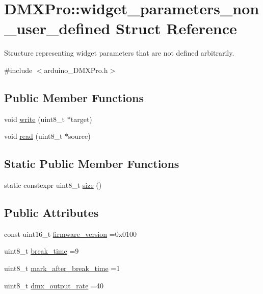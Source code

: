 \hypertarget{structDMXPro_1_1widget__parameters__non__user__defined}{}\section{D\+M\+X\+Pro\+:\+:widget\+\_\+parameters\+\_\+non\+\_\+user\+\_\+defined Struct Reference}
\label{structDMXPro_1_1widget__parameters__non__user__defined}


Structure representing widget parameters that are not defined arbitrarily.  




{\ttfamily \#include $<$arduino\+\_\+\+D\+M\+X\+Pro.\+h$>$}

\subsection*{Public Member Functions}
\begin{DoxyCompactItemize}
\item 
void \hyperlink{structDMXPro_1_1widget__parameters__non__user__defined_a25c093468533097e9b06f395b98381e4}{write} (uint8\+\_\+t $\ast$target)
\item 
void \hyperlink{structDMXPro_1_1widget__parameters__non__user__defined_a90e515d288e7fc8582622bc3719774ec}{read} (uint8\+\_\+t $\ast$source)
\end{DoxyCompactItemize}
\subsection*{Static Public Member Functions}
\begin{DoxyCompactItemize}
\item 
static constexpr uint8\+\_\+t \hyperlink{structDMXPro_1_1widget__parameters__non__user__defined_a0fe1584a072b9fa8b3f18c3e5b61cedc}{size} ()
\end{DoxyCompactItemize}
\subsection*{Public Attributes}
\begin{DoxyCompactItemize}
\item 
const uint16\+\_\+t \hyperlink{structDMXPro_1_1widget__parameters__non__user__defined_a499e78f749932ed279e0d23a2716f2ae}{firmware\+\_\+version} =0x0100
\item 
uint8\+\_\+t \hyperlink{structDMXPro_1_1widget__parameters__non__user__defined_ae371cdc7a6b668f9360b1e4eee833f5e}{break\+\_\+time} =9
\item 
uint8\+\_\+t \hyperlink{structDMXPro_1_1widget__parameters__non__user__defined_a0622e5c23a87de586955dd8758ec6a2d}{mark\+\_\+after\+\_\+break\+\_\+time} =1
\item 
uint8\+\_\+t \hyperlink{structDMXPro_1_1widget__parameters__non__user__defined_a6e4165490ca2ba56ce3760d6053bb17a}{dmx\+\_\+output\+\_\+rate} =40
\end{DoxyCompactItemize}


